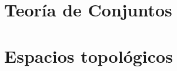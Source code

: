 \documentclass[mid,fleqn,draft,twoside]{notasdeclase}
\begin{document}
 
\frontmatter	
	\begin{titlepage}
	\centering
	
\end{titlepage}
\tableofcontents
\mainmatter

\part{Teoría de Conjuntos}
\label{part:teoria_de_conjuntos}




\part{Espacios topológicos}%
\label{part:espacios_topológicos}




\backmatter
\end{document}
